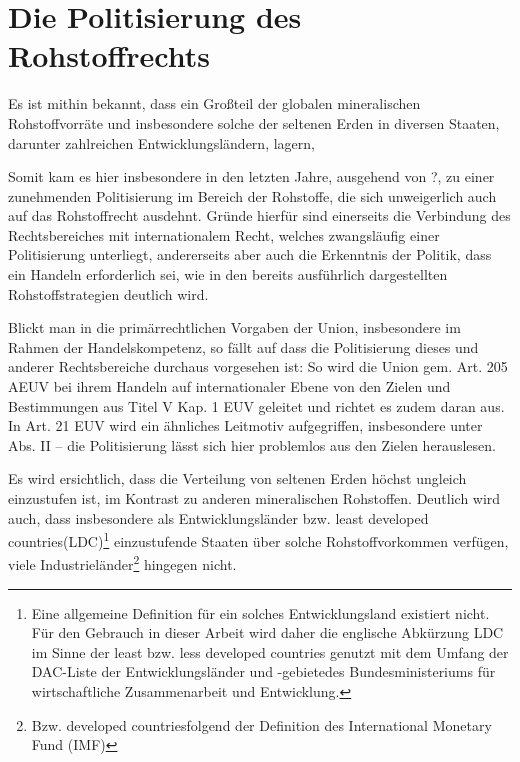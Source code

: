 \documentclass[12pt,a4paper,oneside]{book} %
\begin{document}
	\section{Die Politisierung des Rohstoffrechts}
	
	Es ist mithin bekannt, dass ein Großteil der globalen mineralischen Rohstoffvorräte und insbesondere solche der seltenen Erden in diversen Staaten, darunter zahlreichen Entwicklungsländern, lagern, 
	
	Somit kam es hier insbesondere in den letzten Jahre, ausgehend von ?, zu einer zunehmenden Politisierung im Bereich der Rohstoffe, die sich unweigerlich auch auf das Rohstoffrecht ausdehnt. Gründe hierfür sind einerseits die Verbindung des Rechtsbereiches mit internationalem Recht, welches zwangsläufig einer Politisierung unterliegt, andererseits aber auch die Erkenntnis der Politik, dass ein Handeln erforderlich sei, wie in den bereits ausführlich dargestellten Rohstoffstrategien deutlich wird.
	
	Blickt man in die primärrechtlichen Vorgaben der Union, insbesondere im Rahmen der Handelskompetenz, so fällt auf dass die Politisierung dieses und anderer Rechtsbereiche durchaus vorgesehen ist: So wird die Union gem. Art. 205 AEUV bei ihrem Handeln auf internationaler Ebene von den Zielen und Bestimmungen aus Titel V Kap. 1 EUV geleitet und richtet es zudem daran aus. In Art. 21 EUV wird ein ähnliches Leitmotiv aufgegriffen, insbesondere unter Abs. II -- die Politisierung lässt sich hier problemlos aus den Zielen herauslesen.
	
	
	
	Es wird ersichtlich, dass die Verteilung von seltenen Erden höchst ungleich einzustufen ist, im Kontrast zu anderen mineralischen Rohstoffen. Deutlich wird auch, dass insbesondere als Entwicklungsländer bzw. \glqq least developed countries\grqq (LDC)\footnote{Eine allgemeine Definition für ein solches Entwicklungsland existiert nicht. Für den Gebrauch in dieser Arbeit wird daher die englische Abkürzung LDC im Sinne der least bzw. less developed countries genutzt mit dem Umfang der \glqq DAC-Liste der Entwicklungsländer und -gebiete\grqq des Bundesministeriums für wirtschaftliche Zusammenarbeit und Entwicklung.} einzustufende Staaten über solche Rohstoffvorkommen verfügen, viele Industrieländer\footnote{Bzw. \glqq developed countries\grqq folgend der Definition des International Monetary Fund (IMF)} hingegen nicht. 
	
\end{document}
